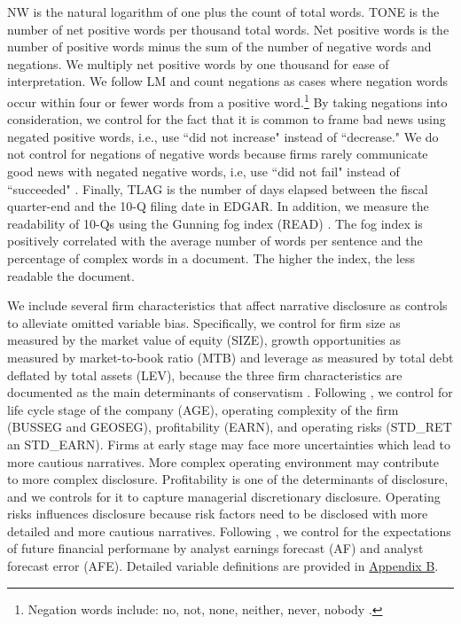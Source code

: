 \documentclass[letterpaper,12pt]{article}
\begin{document}
\begin{spacing}{1.5}
NW is the natural logarithm of one plus the count of total words. TONE is the number of net positive words per thousand total words. Net positive words is the number of positive words minus the sum of the number of negative words and negations. We multiply net positive words by one thousand for ease of interpretation. We follow LM and count negations as cases where negation words occur within four or fewer words from a positive word.\footnote{Negation words include: no, not, none, neither, never, nobody \cite{tottieNegationEnglishSpeech1991}.} By taking negations into consideration, we control for the fact that it is common to frame bad news using negated positive words, i.e., use ``did not increase" instead of ``decrease." We do not control for negations of negative words because firms rarely communicate good news with negated negative words, i.e, use ``did not fail" instead of ``succeeded" \cite{loughranWhenLiabilityNot2011}. Finally, TLAG is the number of days elapsed between the fiscal quarter-end and the 10-Q filing date in EDGAR. In addition, we measure the readability of 10-Qs using the Gunning fog index (READ) \cite{gunningTechniqueClearWriting1952, liAnnualReportReadability2008, loughranMeasuringReadabilityFinancial2014,  guayGuidingFogFinancial2016, loEarningsManagementAnnual2017, busheeLinguisticComplexityFirm2018}. The fog index is positively correlated with the average number of words per sentence and the percentage of complex words in a document. The higher the index, the less readable the document.

We include several firm characteristics that affect narrative disclosure as controls to alleviate omitted variable bias. Specifically, we control for firm size as measured by the market value of equity (SIZE), growth opportunities as measured by market-to-book ratio (MTB) and leverage as measured by total debt deflated by total assets (LEV), because the three firm characteristics are documented as the main determinants of conservatism \cite{wattsConservatismAccountingPart2003, qiangEffectsContractingLitigation2007, khanEstimationEmpiricalProperties2009, laraEconomicDeterminantsConditional2009}. Following , we control for life cycle stage of the company (AGE), operating complexity of the firm (BUSSEG and GEOSEG), profitability (EARN), and operating risks (STD\_RET an STD\_EARN). Firms at early stage may face more uncertainties which lead to more cautious narratives. More complex operating environment may contribute to more complex disclosure. Profitability is one of the determinants of disclosure, and we controls for it to capture managerial discretionary disclosure. Operating risks influences disclosure because risk factors need to be disclosed with more detailed and more cautious narratives. Following , we control for the expectations of future financial performane by analyst earnings forecast (AF) and analyst forecast error (AFE). Detailed variable definitions are provided in \hyperref[appb]{Appendix B}.


\end{spacing}
\end{document}
